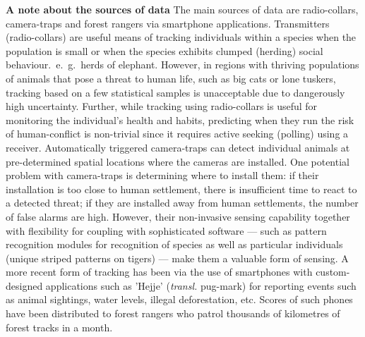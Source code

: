 \documentclass[a4paper,10pt,twocolumn]{article}
\newcommand{\hdg}[1] {\noindent \textbf{#1} }
\begin{document}
\hdg{A note about the sources of data}
The main sources of data are radio-collars, camera-traps and forest rangers via smartphone applications. 
Transmitters (radio-collars) are useful means of tracking individuals within a species when the population is small or when the species exhibits clumped (herding) social behaviour.~e.~g.~herds of elephant. However, in regions with thriving populations of animals that pose a threat to human life, such as big cats or lone tuskers, tracking based on a few statistical samples is unacceptable due to dangerously high uncertainty. Further, while tracking using radio-collars is useful for monitoring the individual's health and habits, predicting when they run the risk of human-conflict is non-trivial since it requires active seeking (polling) using a receiver. 
% 
Automatically triggered camera-traps can detect individual animals at pre-determined spatial locations where the cameras are installed. One potential problem with camera-traps is determining where to install them: if their installation is too close to human settlement, there is insufficient time to react to a detected threat; if they are installed away from human settlements, the number of false alarms are high. However, their non-invasive sensing capability together with flexibility for coupling with sophisticated software --- such as pattern recognition modules for recognition of species as well as particular individuals (unique striped patterns on tigers) --- make them a valuable form of sensing.
% 
A more recent form of tracking has been via the use of smartphones with custom-designed applications such as 'Hejje' (\textit{transl.} pug-mark) for reporting events such as animal sightings, water levels, illegal deforestation, etc. Scores of such phones have been distributed to forest rangers who patrol thousands of kilometres of forest tracks in a month. 
\end{document}
